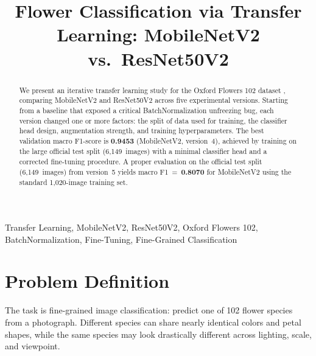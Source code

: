 \documentclass[conference]{IEEEtran}
\begin{document}
\title{Flower Classification via Transfer Learning: MobileNetV2 vs.\ ResNet50V2}

\author{
\and
{}
}

\maketitle

\begin{abstract}
We present an iterative transfer learning study for the Oxford
Flowers 102 dataset \cite{nilsback2008}, comparing MobileNetV2 and
ResNet50V2 across five experimental versions. Starting from a baseline
that exposed a critical BatchNormalization unfreezing bug, each version
changed one or more factors: the split of data used for training, the
classifier head design, augmentation strength, and training
hyperparameters. The best validation macro F1-score is
\textbf{0.9453} (MobileNetV2, version~4), achieved by training on the
large official test split (6,149~images) with a minimal classifier head
and a corrected fine-tuning procedure. A proper evaluation on the
official test split (6,149~images) from version~5 yields macro
F1~=~\textbf{0.8070} for MobileNetV2 using the standard 1,020-image
training set.
\end{abstract}

\begin{IEEEkeywords}
Transfer Learning, MobileNetV2, ResNet50V2, Oxford Flowers 102,
BatchNormalization, Fine-Tuning, Fine-Grained Classification
\end{IEEEkeywords}

\section{Problem Definition}

The task is fine-grained image classification: predict one of 102
flower species from a photograph. Different species can share nearly
identical colors and petal shapes, while the same species may look
drastically different across lighting, scale, and viewpoint.
\end{document}
